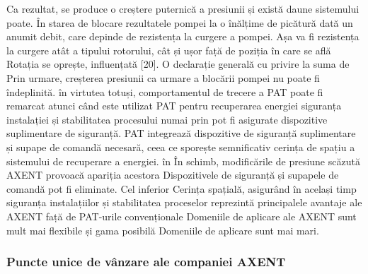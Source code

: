 Ca rezultat, se produce o creștere puternică a presiunii și există daune sistemului
poate. În starea de blocare rezultatele pompei la o înălțime de picătură dată
un anumit debit, care depinde de rezistența la curgere a pompei. Așa va fi
rezistența la curgere atât a tipului rotorului, cât și ușor față de poziția în care se află
Rotația se oprește, influențată [20]. O declarație generală cu privire la suma de
Prin urmare, creșterea presiunii ca urmare a blocării pompei nu poate fi îndeplinită. în virtutea
totuși, comportamentul de trecere a PAT poate fi remarcat atunci când este utilizat
PAT pentru recuperarea energiei siguranța instalației și stabilitatea procesului numai prin
pot fi asigurate dispozitive suplimentare de siguranță.
PAT integrează dispozitive de siguranță suplimentare și supape de comandă
necesară, ceea ce sporește semnificativ cerința de spațiu a sistemului de recuperare a energiei. în
În schimb, modificările de presiune scăzută AXENT provoacă apariția acestora
Dispozitivele de siguranță și supapele de comandă pot fi eliminate. Cel inferior
Cerința spațială, asigurând în același timp siguranța instalațiilor și stabilitatea proceselor
reprezintă principalele avantaje ale AXENT față de PAT-urile convenționale
Domeniile de aplicare ale AXENT sunt mult mai flexibile și gama posibilă
Domeniile de aplicare sunt mai mari.

\subsubsection{Puncte unice de vânzare ale companiei AXENT}

